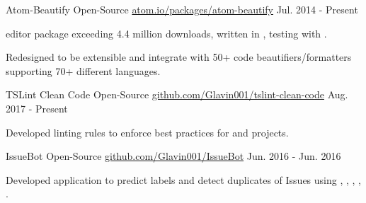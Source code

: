 

\begin{cventries}

  \cventry
    {Atom-Beautify} %
    {Open-Source} %
    {\href{https://atom.io/packages/atom-beautify}{atom.io/packages/atom-beautify}} %
    {Jul. 2014 - Present} %
    {
      \begin{cvitems} %
        \item { editor package exceeding 4.4 million downloads, written in , testing with .}
        \item {Redesigned to be extensible and integrate with 50+ code beautifiers/formatters supporting 70+ different languages.}
      \end{cvitems}
    }

\cventry
{TSLint Clean Code} %
{Open-Source} %
{\href{https://github.com/Glavin001/tslint-clean-code}{github.com/Glavin001/tslint-clean-code}} %
{Aug. 2017 - Present} %
{
  \begin{cvitems} %
    \item {Developed  linting rules to enforce  best practices for  and  projects.}
  \end{cvitems}
}

  \cventry
    {IssueBot} %
    {Open-Source} %
    {\href{https://github.com/Glavin001/IssueBot}{github.com/Glavin001/IssueBot}} %
    {Jun. 2016 - Jun. 2016} %
    {
      \begin{cvitems} %
        \item {Developed application to predict labels and detect duplicates of  Issues using , , , , .}
      \end{cvitems}
    }

\end{cventries}
